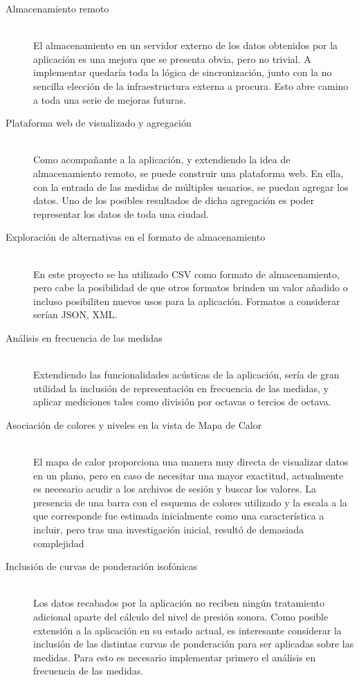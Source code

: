 \begin{description}
	\item[Almacenamiento remoto] \hfill \\	
	El almacenamiento en un servidor externo de los datos obtenidos por la aplicación es una mejora que se presenta obvia, pero no trivial. A implementar quedaría toda la lógica de sincronización, junto con la no sencilla elección de la infraestructura externa a procura. Esto abre camino a toda una serie de mejoras futuras.	
	
	\item[Plataforma web de visualizado y agregación]\hfill \\	
	Como acompañante a la aplicación, y extendiendo la idea de almacenamiento remoto, se puede construir una plataforma web. En ella, con la entrada de las medidas de múltiples usuarios, se puedan agregar los datos. Uno de los posibles resultados de dicha agregación es poder representar los datos de toda una ciudad.
	
    \item[Exploración de alternativas en el formato de almacenamiento]\hfill \\	
    En este proyecto se ha utilizado \ac{CSV} como formato de almacenamiento, pero cabe la posibilidad de que otros formatos brinden un valor añadido o incluso posibiliten nuevos usos para la aplicación. Formatos a considerar serían \acl{JSON}, \ac{XML}.
    
    \item[Análisis en frecuencia de las medidas]\hfill \\
    Extendiendo las funcionalidades acústicas de la aplicación, sería de gran utilidad la inclusión de representación en frecuencia de las medidas, y aplicar mediciones tales como división por octavas o tercios de octava.
    
    \item[Asociación de colores y niveles en la vista de Mapa de Calor]\hfill\\
    El mapa de calor proporciona una manera muy directa de visualizar datos en un plano, pero en caso de necesitar una mayor exactitud, actualmente es necesario acudir a los archivos de sesión y buscar los valores. La presencia de una barra con el esquema de colores utilizado y la escala a la que corresponde fue estimada inicialmente como una característica a incluir, pero tras una investigación inicial, resultó de demasiada complejidad 
    
    \item[Inclusión de curvas de ponderación isofónicas]\hfill\\
    Los datos recabados por la aplicación no reciben ningún tratamiento adicional aparte del cálculo del nivel de presión sonora. Como posible extensión a la aplicación en su estado actual, es interesante considerar la inclusión de las distintas curvas de ponderación para ser aplicadas sobre las medidas. Para esto es necesario implementar primero el análisis en frecuencia de las medidas.
    

\end{description}
